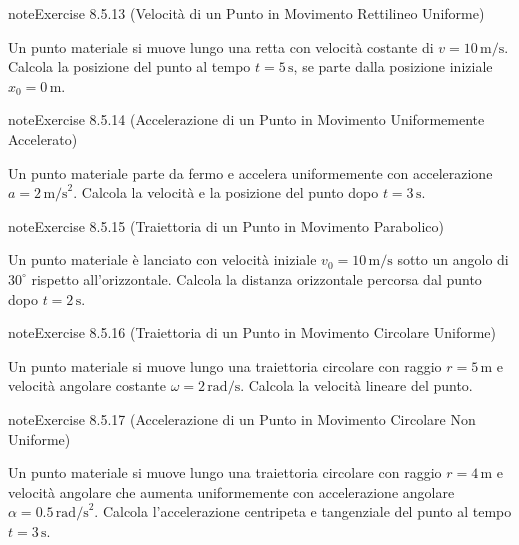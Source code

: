 \documentclass[letterpaper,10pt,italian]{jupyterBook}
\begin{document}
\begin{sphinxadmonition}{note}{Exercise 8.5.13 (Velocità di un Punto in Movimento Rettilineo Uniforme)}



\sphinxAtStartPar
Un punto materiale si muove lungo una retta con velocità costante di \(v = 10 \, \text{m/s}\). Calcola la posizione del punto al tempo \(t = 5 \, \text{s}\), se parte dalla posizione iniziale \(x_0 = 0 \, \text{m}\).
\end{sphinxadmonition}
 \label{exercise:ch/mechanics/kinematics-problems-exercise-13}

\begin{sphinxadmonition}{note}{Exercise 8.5.14 (Accelerazione di un Punto in Movimento Uniformemente Accelerato)}



\sphinxAtStartPar
Un punto materiale parte da fermo e accelera uniformemente con accelerazione \(a = 2 \, \text{m/s}^2\). Calcola la velocità e la posizione del punto dopo \(t = 3 \, \text{s}\).
\end{sphinxadmonition}
 \label{exercise:ch/mechanics/kinematics-problems-exercise-14}

\begin{sphinxadmonition}{note}{Exercise 8.5.15 (Traiettoria di un Punto in Movimento Parabolico)}



\sphinxAtStartPar
Un punto materiale è lanciato con velocità iniziale \(v_0 = 10 \, \text{m/s}\) sotto un angolo di \(30^\circ\) rispetto all’orizzontale. Calcola la distanza orizzontale percorsa dal punto dopo \(t = 2 \, \text{s}\).
\end{sphinxadmonition}
 \label{exercise:ch/mechanics/kinematics-problems-exercise-15}

\begin{sphinxadmonition}{note}{Exercise 8.5.16 (Traiettoria di un Punto in Movimento Circolare Uniforme)}



\sphinxAtStartPar
Un punto materiale si muove lungo una traiettoria circolare con raggio \(r = 5 \, \text{m}\) e velocità angolare costante \(\omega = 2 \, \text{rad/s}\). Calcola la velocità lineare del punto.
\end{sphinxadmonition}
 \label{exercise:ch/mechanics/kinematics-problems-exercise-16}

\begin{sphinxadmonition}{note}{Exercise 8.5.17 (Accelerazione di un Punto in Movimento Circolare Non Uniforme)}



\sphinxAtStartPar
Un punto materiale si muove lungo una traiettoria circolare con raggio \(r = 4 \, \text{m}\) e velocità angolare che aumenta uniformemente con accelerazione angolare \(\alpha = 0.5 \, \text{rad/s}^2\). Calcola l’accelerazione centripeta e tangenziale del punto al tempo \(t = 3 \, \text{s}\).
\end{sphinxadmonition}
\end{document}
